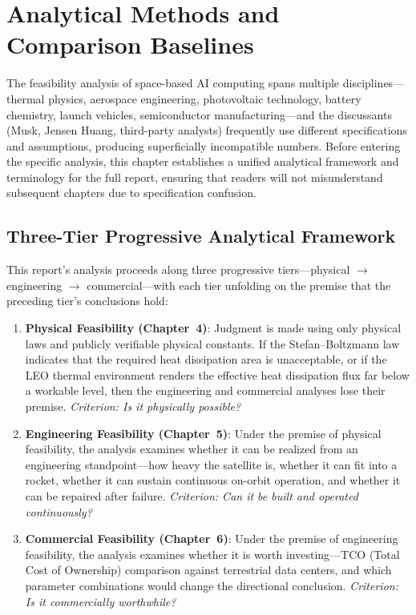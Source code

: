 
\section{Analytical Methods and Comparison Baselines}

The feasibility analysis of space-based AI computing spans multiple disciplines---thermal physics, aerospace engineering, photovoltaic technology, battery chemistry, launch vehicles, semiconductor manufacturing---and the discussants (Musk, Jensen Huang, third-party analysts) frequently use different specifications and assumptions, producing superficially incompatible numbers. Before entering the specific analysis, this chapter establishes a unified analytical framework and terminology for the full report, ensuring that readers will not misunderstand subsequent chapters due to specification confusion.

\subsection{Three-Tier Progressive Analytical Framework}

This report's analysis proceeds along three progressive tiers---physical $\to$ engineering $\to$ commercial---with each tier unfolding on the premise that the preceding tier's conclusions hold:

\begin{enumerate}[leftmargin=*]
    \item \textbf{Physical Feasibility (Chapter~4)}: Judgment is made using only physical laws and publicly verifiable physical constants. If the Stefan--Boltzmann law indicates that the required heat dissipation area is unacceptable, or if the LEO thermal environment renders the effective heat dissipation flux far below a workable level, then the engineering and commercial analyses lose their premise. \emph{Criterion: Is it physically possible?}
    \item \textbf{Engineering Feasibility (Chapter~5)}: Under the premise of physical feasibility, the analysis examines whether it can be realized from an engineering standpoint---how heavy the satellite is, whether it can fit into a rocket, whether it can sustain continuous on-orbit operation, and whether it can be repaired after failure. \emph{Criterion: Can it be built and operated continuously?}
    \item \textbf{Commercial Feasibility (Chapter~6)}: Under the premise of engineering feasibility, the analysis examines whether it is worth investing---TCO (Total Cost of Ownership) comparison against terrestrial data centers, and which parameter combinations would change the directional conclusion. \emph{Criterion: Is it commercially worthwhile?}
\end{enumerate}

